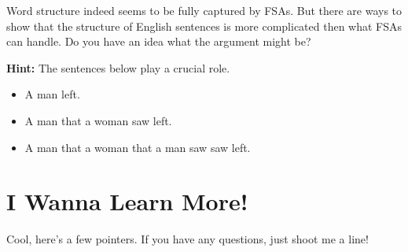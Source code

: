 \bigskip
\begin{homework}
    Word structure indeed seems to be fully captured by FSAs.
    But there are ways to show that the structure of English sentences is more complicated then what FSAs can handle.
    Do you have an idea what the argument might be?
    
    \smallskip
    \textbf{Hint:} The sentences below play a crucial role.
        \begin{itemize}
            \item A man left.
            \item A man that a woman saw left.
            \item A man that a woman that a man saw saw left.
        \end{itemize}
\end{homework}

\section{I Wanna Learn More!}

Cool, here's a few pointers.
If you have any questions, just shoot me a line!

